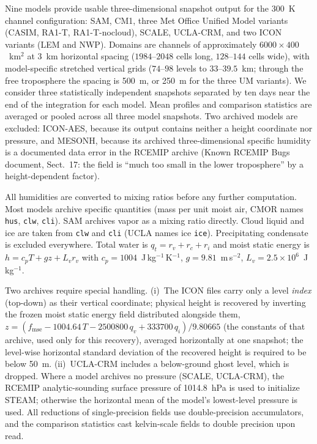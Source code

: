 \documentclass{article}
\begin{document}
Nine models provide usable three-dimensional snapshot output for the
300~K channel configuration: SAM, CM1, three Met Office Unified Model
variants (CASIM, RA1-T, RA1-T-nocloud), SCALE, UCLA-CRM, and two ICON
variants (LEM and NWP). Domains are channels of approximately
$6000\times 400$~km$^2$ at 3~km horizontal spacing ($1984$--$2048$
cells long, $128$--$144$ cells wide), with model-specific stretched
vertical grids ($74$--$98$ levels to $33$--$39.5$~km; through the free
troposphere the spacing is 500~m, or 250~m for the three UM variants).
We consider three statistically independent snapshots separated by ten days near the end
of the integration for each model. Mean profiles and comparison statistics are averaged or pooled across all three model snapshots. Two
archived models are excluded: ICON-AES, because its output contains
neither a height coordinate nor pressure, and MESONH, because its archived
three-dimensional specific humidity is a documented data error in the
RCEMIP archive (Known RCEMIP Bugs document, Sect.~17: the field is
``much too small in the lower troposphere'' by a height-dependent
factor).

All humidities are converted to mixing ratios before any further
computation. Most models archive specific quantities (mass per unit
moist air, CMOR names \texttt{hus}, \texttt{clw}, \texttt{cli}). SAM archives vapor as a
mixing ratio directly. Cloud liquid and ice are taken from
\texttt{clw} and \texttt{cli} (UCLA names ice \texttt{ice}).
Precipitating condensate is excluded everywhere. Total water is $q_t = r_v + r_c + r_i$ and
moist static energy is $h = c_p T + g z + L_v r_v$ with
$c_p = 1004$~J\,kg$^{-1}$\,K$^{-1}$, $g = 9.81$~m\,s$^{-2}$,
$L_v = 2.5\times 10^6$~J\,kg$^{-1}$.

Two archives require special handling. (i)~The ICON files carry only a
level \emph{index} (top-down) as their vertical coordinate; physical
height is recovered by inverting the frozen moist static energy field
distributed alongside them, $z = (f_{\mathrm{mse}} - 1004.64\,T -
2500800\,q_v + 333700\,q_i)/9.80665$ (the constants of that archive,
used only for this recovery), averaged horizontally at one snapshot;
the level-wise horizontal standard deviation of the recovered height
is required to be below 50~m. (ii)~UCLA-CRM includes a below-ground ghost level, which is
dropped. Where a model archives no pressure (SCALE, UCLA-CRM), the
RCEMIP analytic-sounding surface pressure of 1014.8~hPa is used to
initialize STEAM; otherwise the horizontal mean of the model's
lowest-level pressure is used. All reductions of single-precision
fields use double-precision accumulators, and the comparison
statistics cast kelvin-scale fields to double precision upon read.
\end{document}

